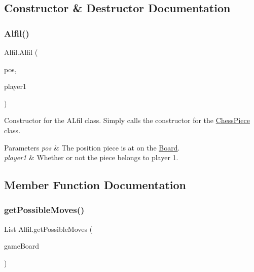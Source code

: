 \subsection{Constructor \& Destructor Documentation}
\mbox{\label{class_alfil_af18a0e0f9b15623984ae32c3945b1be8}} 
\subsubsection{\texorpdfstring{Alfil()}{Alfil()}}
{\footnotesize\ttfamily Alfil.\+Alfil (\begin{DoxyParamCaption}\item[{@Not\+Null int \mbox{[}$\,$\mbox{]}}]{pos,  }\item[{boolean}]{player1 }\end{DoxyParamCaption})}

Constructor for the A\+Lfil class. Simply calls the constructor for the \mbox{\hyperlink{class_chess_piece}{Chess\+Piece}} class. 
\begin{DoxyParams}{Parameters}
{\em pos} & The position piece is at on the \mbox{\hyperlink{class_board}{Board}}. \\
\hline
{\em player1} & Whether or not the piece belongs to player 1. \\
\hline
\end{DoxyParams}


\subsection{Member Function Documentation}
\mbox{\label{class_alfil_a2acff175931d000782b2cc7cb9d3fdca}} 
\subsubsection{\texorpdfstring{get\+Possible\+Moves()}{getPossibleMoves()}}
{\footnotesize\ttfamily List Alfil.\+get\+Possible\+Moves (\begin{DoxyParamCaption}\item[{@Not\+Null \mbox{\hyperlink{class_board}{Board}}}]{game\+Board }\end{DoxyParamCaption})}

